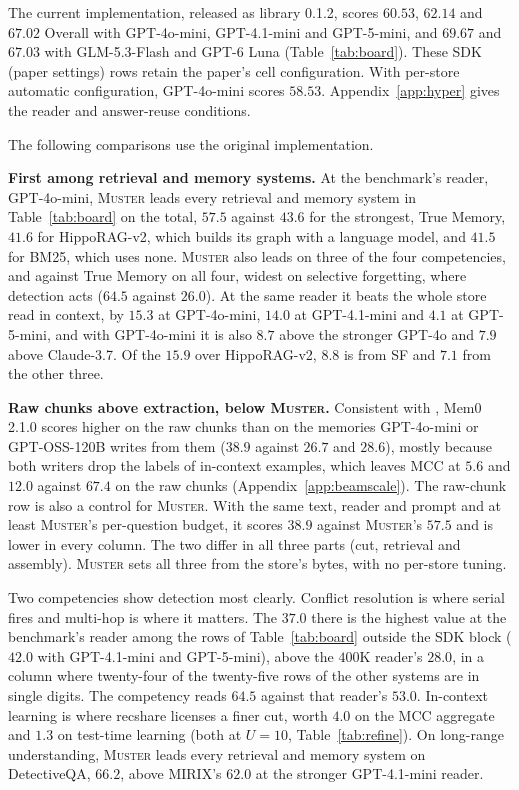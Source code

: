 \documentclass{article}
\newcommand{\sys}{\textsc{Muster}}
\newcommand{\serial}{\textsf{serial}}
\newcommand{\cov}{\textsf{recshare}}
\begin{document}
The current implementation, released as library 0.1.2, scores $60.53$, $62.14$ and $67.02$ Overall with GPT-4o-mini, GPT-4.1-mini and GPT-5-mini, and $69.67$ and $67.03$ with GLM-5.3-Flash and GPT-6 Luna (Table~\ref{tab:board}). These SDK (paper settings) rows retain the paper's cell configuration. With per-store automatic configuration, GPT-4o-mini scores $58.53$. Appendix~\ref{app:hyper} gives the reader and answer-reuse conditions.

The following comparisons use the original implementation.

\textbf{First among retrieval and memory systems.} At the benchmark's reader, GPT-4o-mini, \sys{} leads every retrieval and memory system in
Table~\ref{tab:board} on the total, $57.5$ against $43.6$ for the strongest, True Memory, $41.6$ for HippoRAG-v2, which builds its graph with a language model, and $41.5$ for BM25, which uses none. \sys{} also leads on three of the four competencies, and against True Memory on all four, widest on selective forgetting, where detection acts ($64.5$ against $26.0$). At the
same reader it beats the whole store read in context, by $15.3$ at GPT-4o-mini, $14.0$ at GPT-4.1-mini and
$4.1$ at GPT-5-mini, and with GPT-4o-mini it is also $8.7$ above the stronger GPT-4o and $7.9$ above Claude-3.7. Of the $15.9$ over HippoRAG-v2, $8.8$ is from SF and $7.1$ from the other three.

\textbf{Raw chunks above extraction, below \sys{}.} Consistent with \cite{fidelity}, Mem0 2.1.0 scores higher on the raw chunks than on the memories GPT-4o-mini or GPT-OSS-120B writes from them ($38.9$ against $26.7$ and $28.6$), mostly because both writers drop the labels of in-context examples, which leaves MCC at $5.6$ and $12.0$ against $67.4$ on the raw chunks (Appendix~\ref{app:beamscale}). The raw-chunk row is also a control for \sys{}. With the same text, reader and prompt and at least \sys{}'s per-question budget, it scores $38.9$ against \sys{}'s $57.5$ and is lower in every column. The two differ in all three parts (cut, retrieval and assembly). \sys{} sets all three from the store's bytes, with no per-store tuning.

Two competencies show detection most clearly. Conflict resolution is where \serial{} fires and
multi-hop is where it matters. The $37.0$ there is the highest value at the benchmark's reader among the rows of Table~\ref{tab:board} outside the SDK block ($42.0$ with GPT-4.1-mini and GPT-5-mini), above the
$400$K reader's $28.0$, in a column where twenty-four of the twenty-five rows of the other systems are in single digits.
The competency reads $64.5$ against that reader's $53.0$.
In-context learning is where \cov{} licenses a finer cut, worth $4.0$ on the MCC aggregate and $1.3$ on test-time learning (both at $U=10$, Table~\ref{tab:refine}). On long-range understanding, \sys{} leads every retrieval and memory system on DetectiveQA, $66.2$, above MIRIX's $62.0$ at the stronger GPT-4.1-mini reader.
\end{document}
